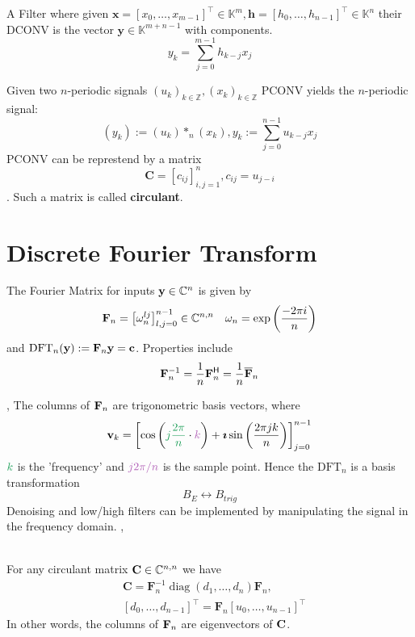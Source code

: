  A Filter where given $\mathbf{x}=\left[x_{0}, \ldots, x_{m-1}\right]^{\top} \in \mathbb{K}^{m}, \mathbf{h}=\left[h_{0}, \ldots, h_{n-1}\right]^{\top} \in \mathbb{K}^{n}$ their DCONV is the vector $\mathbf{y} \in \mathbb{K}^{m+n-1}$ with components.
$$y_{k}=\sum_{j=0}^{m-1} h_{k-j} x_{j}$$

 Given two $n$-periodic signals $\left(u_{k}\right)_{k \in \mathbb{Z}},\left(x_{k}\right)_{k \in \mathbb{Z}}$ PCONV yields the $n$-periodic signal:
$$\left(y_{k}\right):=\left(u_{k}\right) *_{n}\left(x_{k}\right), y_{k}:=\sum_{j=0}^{n-1} u_{k-j} x_{j}$$
PCONV can be represtend by a matrix $$\mathbf{C}=\left[c_{i j}\right]_{i, j=1}^{n}, c_{i j} = u_{j-i}$$. Such a matrix is called \textbf{circulant}.

\section{Discrete Fourier Transform}
The Fourier Matrix for inputs $\mathbf{y} \in \mathbb{C}^{n}$ is given by
$$ \mathbf{F}_n = \left[\omega_{n}^{l j}\right]_{l, j=0}^{n-1} \in \mathbb{C}^{n, n} \quad \omega_{n} = \exp\left(\frac{-2\pi i}{n}\right)$$
and $\mathrm{DFT}_{n}(\mathbf{y}):=\mathbf{F}_{n} \mathbf{y} = \mathbf{c}$. Properties include\\
$$\mathbf{F}_{n}^{-1}=\frac{1}{n} \mathbf{F}_{n}^{\mathsf{H}}=\frac{1}{n} \overline{\mathbf{F}}_{n}$$

\sep
{}
The columns of $\mathbf{F}_n$ are trigonometric basis vectors, where 
$$\vv_k = \left[\cos \left(\tcg{j\frac{2 \pi}{n}}\cdot \tcp{k}\right)+\boldsymbol{\imath} \sin \left(\frac{2 \pi j k}{n}\right)\right]_{j=0}^{n-1}$$
$\tcg{k}$ is the 'frequency' and $\tcp{j2\pi/n}$ is  the sample point.
Hence the $\mathrm{DFT}_{n}$ is a basis transformation $$B_E \leftrightarrow B_{trig}$$
Denoising and low/high filters can be implemented by manipulating the signal in the frequency domain.
\sep

 \\
For any circulant matrix $\mathbf{C} \in \mathbb{C}^{n,n}$ we have 
\begin{align*}
&\mathbf{C}=\mathbf{F}_{n}^{-1} \operatorname{diag}\left(d_{1}, \ldots, d_{n}\right) \mathbf{F}_{n}, \\ 
&\left[d_{0}, \ldots, d_{n-1}\right]^{\top}=\mathbf{F}_{n}\left[u_{0}, \ldots, u_{n-1}\right]^{\top}
\end{align*}
In other words, the columns of $\mathbf{F}_n$ are eigenvectors of $\mathbf{C}$. \\

